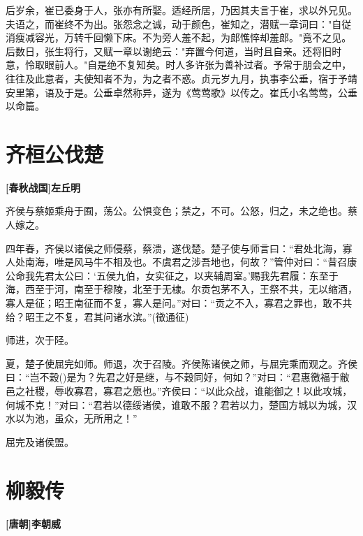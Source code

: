 \documentclass[UTF8,titlepage,oneside]{ctexbook}
\begin{document}
后岁余，崔已委身于人，张亦有所娶。适经所居，乃因其夫言于崔，求以外兄见。夫语之，而崔终不为出。张怨念之诚，动于颜色，崔知之，潜赋一章词曰："自従消瘦减容光，万转千回懒下床。不为旁人羞不起，为郎憔悴却羞郎。"竟不之见。后数日，张生将行，又赋一章以谢绝云："弃置今何道，当时且自亲。还将旧时意，怜取眼前人。"自是绝不复知矣。时人多许张为善补过者。予常于朋会之中，往往及此意者，夫使知者不为，为之者不惑。贞元岁九月，执事李公垂，宿于予靖安里第，语及于是。公垂卓然称异，遂为《莺莺歌》以传之。崔氏小名莺莺，公垂以命篇。


\chapter*{齐桓公伐楚}
\begin{center}
	\textbf{[春秋战国]左丘明}
\end{center}

齐侯与蔡姬乘舟于囿，荡公。公惧变色；禁之，不可。公怒，归之，未之绝也。蔡人嫁之。

四年春，齐侯以诸侯之师侵蔡，蔡溃，遂伐楚。楚子使与师言曰：“君处北海，寡人处南海，唯是风马牛不相及也。不虞君之涉吾地也，何故？”管仲对曰：“昔召康公命我先君太公曰：‘五侯九伯，女实征之，以夹辅周室。’赐我先君履：东至于海，西至于河，南至于穆陵，北至于无棣。尔贡包茅不入，王祭不共，无以缩酒，寡人是征；昭王南征而不复，寡人是问。”对曰：“贡之不入，寡君之罪也，敢不共给？昭王之不复，君其问诸水滨。”(徵通征)

师进，次于陉。

夏，楚子使屈完如师。师退，次于召陵。齐侯陈诸侯之师，与屈完乘而观之。齐侯曰：“岂不榖()是为？先君之好是继，与不榖同好，何如？”对曰：“君惠徼福于敝邑之社稷，辱收寡君，寡君之愿也。”齐侯曰：“以此众战，谁能御之！以此攻城，何城不克！”对曰：“君若以德绥诸侯，谁敢不服？君若以力，楚国方城以为城，汉水以为池，虽众，无所用之！”

屈完及诸侯盟。


\chapter*{柳毅传}
\begin{center}
	\textbf{[唐朝]李朝威}
\end{center}
\end{document}
